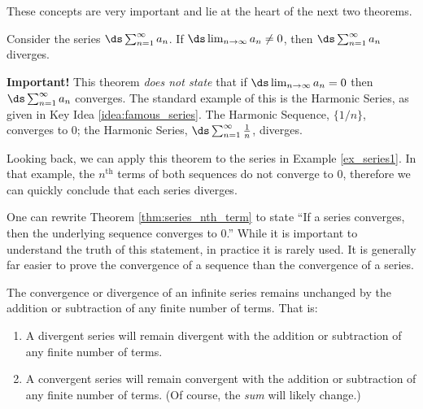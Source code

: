 These concepts are very important and lie at the heart of the next two theorems.

{Consider the series $\ds\sum_{n=1}^\infty a_n$. If $\ds \lim_{n\to\infty}a_n \neq 0$, then $\ds\sum_{n=1}^\infty a_n$ diverges.
}

\textbf{Important!} This theorem \emph{does not state} that if $\ds \lim_{n\to\infty} a_n = 0$ then $\ds \sum_{n=1}^\infty  a_n $ converges. The standard example of this is the Harmonic Series, as given in Key Idea \ref{idea:famous_series}. The Harmonic Sequence, $\{1/n\}$, converges to 0; the Harmonic Series, $\ds \sum_{n=1}^\infty \frac1n$, diverges.


Looking back, we can apply this theorem to the series in Example \ref{ex_series1}. In that example, the $n^\text{th}$ terms of both sequences do not converge to 0, therefore we can quickly conclude that each series diverges.

One can rewrite Theorem \ref{thm:series_nth_term} to state ``If a series converges, then the underlying sequence converges to 0.'' While it is important to understand the truth of this statement, in practice it is rarely used. It is generally far easier to prove the convergence of a sequence than the convergence of a series. 



{The convergence or divergence of an infinite series remains unchanged by the addition or subtraction of any finite number of terms. That is:
	\begin{enumerate}
	\item		A divergent series will remain divergent with the addition or subtraction of any finite number of terms.
	\item		A convergent series will remain convergent with the addition or subtraction of any finite number of terms. (Of course, the \emph{sum} will likely change.)
	\end{enumerate}
}

